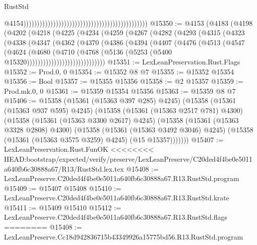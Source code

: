 \begin{lexlean}{RustStd}
\begin{coremodule}
{\begin{coremodule}
{{{{{{{{{{{{{{{{{{{{{{{{{{{{{{{{{{{{{{{{{{{{{{{{{{{{{{{{{{{{                                                                                                @4154))))))))))))))))))))))))))))))))))))))))))))))
@15350 := @4153
    (@4183
      (@4198
        (@4202
          (@4218
            (@4225
              (@4234
                (@4259
                  (@4267
                    (@4282
                      (@4293
                        (@4315
                          (@4323
                            (@4338
                              (@4347
                                (@4362
                                  (@4370
                                    (@4386
                                      (@4394
                                        (@4407
                                          (@4476
                                            (@4513
                                              (@4547
                                                (@4624
                                                  (@4680
                                                    (@4710
                                                      (@4768
                                                        (@5136
                                                          (@5253
                                                            (@5400
                                                              @15320)))))))))))))))))))))))))))))
@15351 := LexLeanPreservation.Rust.Flags
@15352 := Prod.{0, 0}
@15354 := @15352 @8 @7
@15355 := @15352 @15354
@15356 := Bool
@15357 := @15355 @15356
@15358 := @2 @15357
@15359 := Prod.mk.{0, 0}
@15361 := @15359 @15354 @15356
@15363 := @15359 @8 @7
@15406 := @15358
    (@15361 (@15363 @397 @285) @4245)
    (@15358
      (@15361 (@15363 @937 @595) @4245)
      (@15358
        (@15361 (@15363 @2517 @781) @4300)
        (@15358
          (@15361 (@15363 @3300 @2617) @4245)
          (@15358
            (@15361 (@15363 @3328 @2808) @4300)
            (@15358
              (@15361 (@15363 @3492 @3046) @4245)
              (@15358 (@15361 (@15363 @3575 @3259) @4245) (@15 @15357)))))))
@15407 := LexLeanPreservation.Rust.FunOK
<<<<<<<< HEAD:bootstrap/expected/verify/preserve/LexLeanPreserve/C20ded4f4be0e5011a640fb6c30888a67/R13/RustStd.lex.tex
@15408 := LexLeanPreserve.C20ded4f4be0e5011a640fb6c30888a67.R13.RustStd.program
@15409 := @15407 @15408
@15410 := LexLeanPreserve.C20ded4f4be0e5011a640fb6c30888a67.R13.RustStd.krate
@15411 := @15409 @15410
@15412 := LexLeanPreserve.C20ded4f4be0e5011a640fb6c30888a67.R13.RustStd.flags
========
@15408 := LexLeanPreserve.Cc18d942836715b43349926a15775bd56.R13.RustStd.program
}}}}}}}}}}}}}}}}}}}}}}}}}}}}}}}}}}}}}}}}}}}}}}}}}}}}}}}}}}}}
\end{coremodule}}
\end{coremodule}
\end{lexlean}
